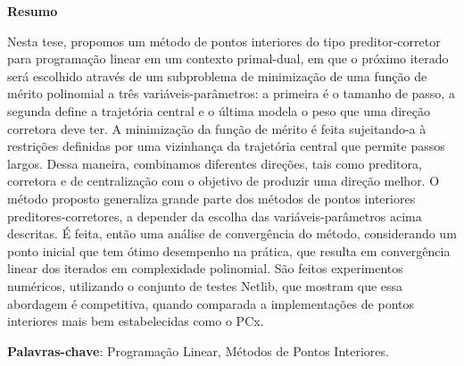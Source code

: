 \begin{center}
  \large{\textbf{Resumo}}
\end{center}

Nesta tese, propomos um método de pontos interiores do tipo preditor-corretor para programação linear em um contexto primal-dual, em que o próximo iterado será escolhido através de um subproblema de minimização de uma função de mérito polinomial a três variáveis-parâmetros: a primeira  é o tamanho de passo, a segunda define a trajetória central e o última modela o peso que uma direção corretora deve ter. A minimização da função de mérito é feita   sujeitando-a à restrições  definidas por uma vizinhança da trajetória central que permite passos largos. Dessa maneira, combinamos diferentes direções, tais como preditora, corretora e de centralização com o objetivo de produzir uma direção melhor. O método proposto generaliza grande parte dos métodos de pontos interiores preditores-corretores, a depender da escolha das variáveis-parâmetros acima descritas. É feita, então uma análise de convergência do método, considerando um ponto inicial que tem ótimo desempenho na prática, que resulta em convergência linear dos iterados em complexidade polinomial. São feitos experimentos numéricos, utilizando o conjunto de testes Netlib, que mostram que essa abordagem é competitiva, quando comparada a implementações de pontos interiores mais bem estabelecidas como o PCx.




\vspace{.2cm}
\textbf{Palavras-chave}:
Programação Linear, Métodos de Pontos Interiores.
